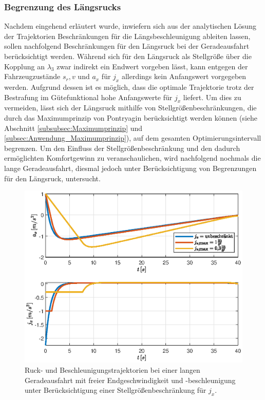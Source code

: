 \subsubsection{Begrenzung des Längsrucks}
Nachdem eingehend erläutert wurde, inwiefern sich aus der analytischen Lösung der Trajektorien Beschränkungen für die Längsbeschleunigung ableiten lassen, sollen nachfolgend Beschränkungen für den Längsruck bei der Geradeausfahrt berücksichtigt werden. Während sich für den Längsruck als Stellgröße über die Kopplung an $\lambda_3$ zwar indirekt ein Endwert vorgeben lässt, kann entgegen der Fahrzeugzustände $s_r, v$ und $a_x$ für $j_x$ allerdings kein Anfangswert vorgegeben werden. Aufgrund dessen ist es möglich, dass die optimale Trajektorie trotz der Bestrafung im Gütefunktional hohe Anfangswerte für $j_x$ liefert. Um dies zu vermeiden, lässt sich der Längsruck mithilfe von Stellgrößenbeschränkungen, die durch das Maximumprinzip von Pontryagin berücksichtigt werden können (siehe Abschnitt \ref{subsubsec:Maximumprinzip} und \ref{subsec:Anwendung_Maximumprinzip}), auf dem gesamten Optimierungsintervall begrenzen. Um den Einfluss der Stellgrößenbeschränkung und den dadurch ermöglichten Komfortgewinn zu veranschaulichen, wird nachfolgend nochmals die lange Geradeausfahrt, diesmal jedoch unter Berücksichtigung von Begrenzungen für den Längsruck, untersucht. 
\begin{figure}[h] 
	\centering
	\includegraphics[width=0.8\linewidth]{./Bilder/Ergebnisse/Geradeausfahrt/vf_af_frei_stellgroessenbeschr_ax_und_jx.eps}
	\caption{Ruck- und Beschleunigungstrajektorien bei einer langen Geradeausfahrt mit freier Endgeschwindigkeit und -beschleunigung unter Berücksichtigung einer Stellgrößenbeschränkung für $j_x$.}
	\label{fig:vf_af_frei_stellgroessenbeschr}
\end{figure} 
